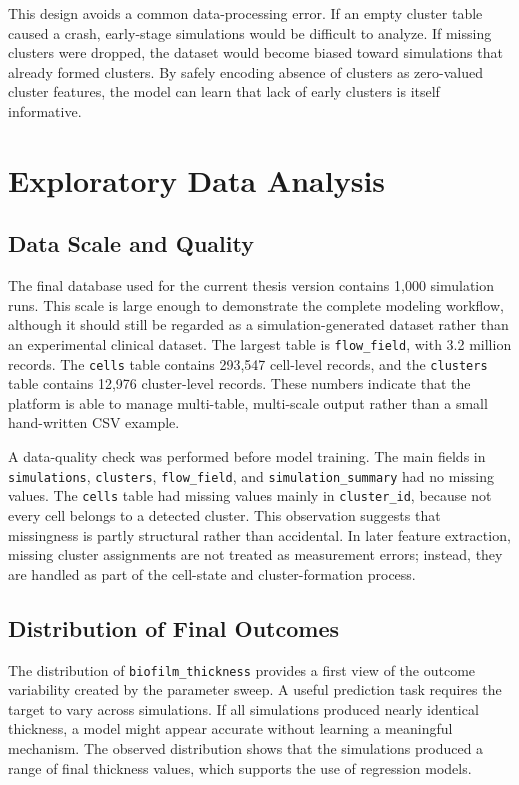 \documentclass[12pt,a4paper,oneside]{report}
\begin{document}
This design avoids a common data-processing error. If an empty cluster table caused a crash, early-stage simulations would be difficult to analyze. If missing clusters were dropped, the dataset would become biased toward simulations that already formed clusters. By safely encoding absence of clusters as zero-valued cluster features, the model can learn that lack of early clusters is itself informative.

\chapter{Exploratory Data Analysis}

\section{Data Scale and Quality}
The final database used for the current thesis version contains 1,000 simulation runs. This scale is large enough to demonstrate the complete modeling workflow, although it should still be regarded as a simulation-generated dataset rather than an experimental clinical dataset. The largest table is \texttt{flow\_field}, with 3.2 million records. The \texttt{cells} table contains 293,547 cell-level records, and the \texttt{clusters} table contains 12,976 cluster-level records. These numbers indicate that the platform is able to manage multi-table, multi-scale output rather than a small hand-written CSV example.

A data-quality check was performed before model training. The main fields in \texttt{simulations}, \texttt{clusters}, \texttt{flow\_field}, and \texttt{simulation\_summary} had no missing values. The \texttt{cells} table had missing values mainly in \texttt{cluster\_id}, because not every cell belongs to a detected cluster. This observation suggests that missingness is partly structural rather than accidental. In later feature extraction, missing cluster assignments are not treated as measurement errors; instead, they are handled as part of the cell-state and cluster-formation process.

\section{Distribution of Final Outcomes}
The distribution of \texttt{biofilm\_thickness} provides a first view of the outcome variability created by the parameter sweep. A useful prediction task requires the target to vary across simulations. If all simulations produced nearly identical thickness, a model might appear accurate without learning a meaningful mechanism. The observed distribution shows that the simulations produced a range of final thickness values, which supports the use of regression models.
\end{document}
